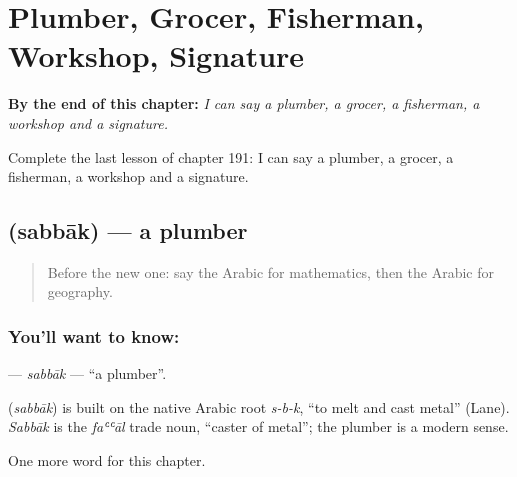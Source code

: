 
\chapter{Plumber, Grocer, Fisherman, Workshop, Signature}
\label{ch:ar-plumber-grocer-fisherman-workshop-signature}

\begin{chapteropening}
\textbf{By the end of this chapter:} \emph{I can say a plumber, a grocer, a fisherman, a workshop and a signature.}

Complete the last lesson of chapter 191: I can say a plumber, a grocer, a fisherman, a workshop and a signature.
\end{chapteropening}

\section[\texorpdfstring{\ar{سباك} (sabbāk)}{سباك (sabbāk)}]{ (sabbāk) — a plumber}

\label{lesson:AR-C191-sabbak}



\begin{quote}
Before the new one: say the Arabic for mathematics, then the Arabic for geography.
\end{quote}

\subsection*{You'll want to know: }
\textbf{} — \emph{sabbāk} — \textquotedblleft{}a plumber\textquotedblright{}.

\begin{cousinweb}
\textbf{} (\emph{sabbāk}) is built on the native Arabic root \emph{s-b-k}, \textquotedblleft{}to melt and cast metal\textquotedblright{} (Lane). \emph{Sabbāk} is the \emph{faʿʿāl} trade noun, \textquotedblleft{}caster of metal\textquotedblright{}; the plumber is a modern sense.
\end{cousinweb}

\begin{grammarlens}[title={What you've built}]
One more word for this chapter.
\end{grammarlens}

